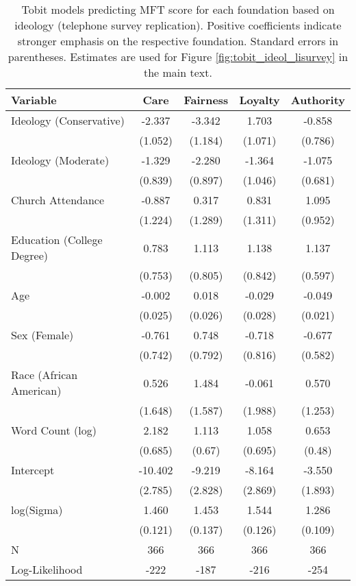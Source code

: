 \begin{table}[ht]
\centering
\caption{Tobit models predicting MFT score for each foundation based 
           on ideology (telephone survey replication). Positive coefficients indicate stronger emphasis on the respective 
           foundation. Standard errors in parentheses. Estimates are used for Figure 
           \ref{fig:tobit_ideol_lisurvey} in the main text.} 
\label{tab:tobit_ideol_lisurvey}
\begingroup\footnotesize
\begin{tabular}{lcccc}
  \hline
Variable & Care & Fairness & Loyalty & Authority \\ 
  \hline
Ideology (Conservative) &  -2.337 & -3.342 &  1.703 & -0.858 \\ 
   & (1.052) & (1.184) & (1.071) & (0.786) \\ 
  Ideology (Moderate) &  -1.329 & -2.280 & -1.364 & -1.075 \\ 
   & (0.839) & (0.897) & (1.046) & (0.681) \\ 
  Church Attendance &  -0.887 &  0.317 &  0.831 &  1.095 \\ 
   & (1.224) & (1.289) & (1.311) & (0.952) \\ 
  Education (College Degree) &   0.783 &  1.113 &  1.138 &  1.137 \\ 
   & (0.753) & (0.805) & (0.842) & (0.597) \\ 
  Age &  -0.002 &  0.018 & -0.029 & -0.049 \\ 
   & (0.025) & (0.026) & (0.028) & (0.021) \\ 
  Sex (Female) &  -0.761 &  0.748 & -0.718 & -0.677 \\ 
   & (0.742) & (0.792) & (0.816) & (0.582) \\ 
  Race (African American) &   0.526 &  1.484 & -0.061 &  0.570 \\ 
   & (1.648) & (1.587) & (1.988) & (1.253) \\ 
  Word Count (log) &   2.182 &  1.113 &  1.058 &  0.653 \\ 
   & (0.685) & (0.67) & (0.695) & (0.48) \\ 
  Intercept & -10.402 & -9.219 & -8.164 & -3.550 \\ 
   & (2.785) & (2.828) & (2.869) & (1.893) \\ 
  log(Sigma) &   1.460 &  1.453 &  1.544 &  1.286 \\ 
   & (0.121) & (0.137) & (0.126) & (0.109) \\ 
   \hline
N & 366 & 366 & 366 & 366 \\ 
  Log-Likelihood & -222 & -187 & -216 & -254 \\ 
   \hline
\end{tabular}
\endgroup
\end{table}
